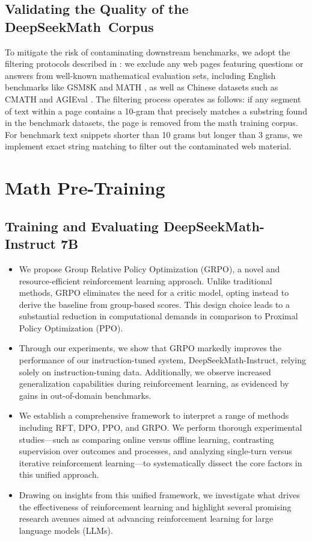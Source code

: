 \subsection{Validating the Quality of the DeepSeekMath~Corpus}

To mitigate the risk of contaminating downstream benchmarks, we adopt the filtering protocols described in \cite{deepseek-coder}: we exclude any web pages featuring questions or answers from well-known mathematical evaluation sets, including English benchmarks like GSM8K \citep{gsm8k} and MATH \citep{MATH}, as well as Chinese datasets such as CMATH \citep{wei2023cmath} and AGIEval \citep{agieval}. The filtering process operates as follows: if any segment of text within a page contains a 10-gram that precisely matches a substring found in the benchmark datasets, the page is removed from the math training corpus. For benchmark text snippets shorter than 10 grams but longer than 3 grams, we implement exact string matching to filter out the contaminated web material.

\section{Math Pre-Training}

\subsection{Training and Evaluating DeepSeekMath-Instruct 7B}

\begin{itemize}[topsep=0pt]
    \item We propose Group Relative Policy Optimization (GRPO), a novel and resource-efficient reinforcement learning approach. Unlike traditional methods, GRPO eliminates the need for a critic model, opting instead to derive the baseline from group-based scores. This design choice leads to a substantial reduction in computational demands in comparison to Proximal Policy Optimization (PPO).
    \item Through our experiments, we show that GRPO markedly improves the performance of our instruction-tuned system, DeepSeekMath-Instruct, relying solely on instruction-tuning data. Additionally, we observe increased generalization capabilities during reinforcement learning, as evidenced by gains in out-of-domain benchmarks.
    \item We establish a comprehensive framework to interpret a range of methods including RFT, DPO, PPO, and GRPO. We perform thorough experimental studies—such as comparing online versus offline learning, contrasting supervision over outcomes and processes, and analyzing single-turn versus iterative reinforcement learning—to systematically dissect the core factors in this unified approach.
    \item Drawing on insights from this unified framework, we investigate what drives the effectiveness of reinforcement learning and highlight several promising research avenues aimed at advancing reinforcement learning for large language models (LLMs).
\end{itemize}

